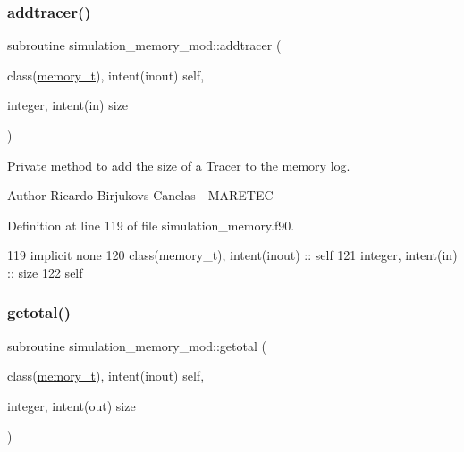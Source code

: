 \subsubsection{\texorpdfstring{addtracer()}{addtracer()}}
{\footnotesize\ttfamily subroutine simulation\+\_\+memory\+\_\+mod\+::addtracer (\begin{DoxyParamCaption}\item[{class(\mbox{\hyperlink{structsimulation__memory__mod_1_1memory__t}{memory\+\_\+t}}), intent(inout)}]{self,  }\item[{integer, intent(in)}]{size }\end{DoxyParamCaption})\hspace{0.3cm}{\ttfamily [private]}}



Private method to add the size of a Tracer to the memory log. 

\begin{DoxyAuthor}{Author}
Ricardo Birjukovs Canelas -\/ M\+A\+R\+E\+T\+EC 
\end{DoxyAuthor}


Definition at line 119 of file simulation\+\_\+memory.\+f90.


\begin{DoxyCode}
119     \textcolor{keywordtype}{implicit none}
120     \textcolor{keywordtype}{class}(memory\_t), \textcolor{keywordtype}{intent(inout)} :: self
121     \textcolor{keywordtype}{integer}, \textcolor{keywordtype}{intent(in)} :: size
122     self%
\end{DoxyCode}
\mbox{\label{namespacesimulation__memory__mod_acf04d6b930ed3ffbc0950afd86033c51}} 
\subsubsection{\texorpdfstring{getotal()}{getotal()}}
{\footnotesize\ttfamily subroutine simulation\+\_\+memory\+\_\+mod\+::getotal (\begin{DoxyParamCaption}\item[{class(\mbox{\hyperlink{structsimulation__memory__mod_1_1memory__t}{memory\+\_\+t}}), intent(inout)}]{self,  }\item[{integer, intent(out)}]{size }\end{DoxyParamCaption})\hspace{0.3cm}{\ttfamily [private]}}



